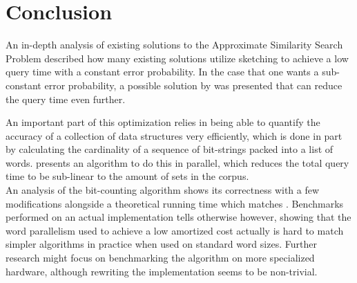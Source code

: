 \section{Conclusion}
An in-depth analysis of existing solutions to the Approximate Similarity Search Problem described how many existing solutions utilize sketching to achieve a low query time with a constant error probability. In the case that one wants a sub-constant error probability, a possible solution by \citet{fast-similarity-search} was presented that can reduce the query time even further.

An important part of this optimization relies in being able to quantify the accuracy of a collection of data structures very efficiently, which is done in part by calculating the cardinality of a sequence of bit-strings packed into a list of words. \citet{fast-similarity-search} presents an algorithm to do this in parallel, which reduces the total query time to be sub-linear to the amount of sets in the corpus.\\
An analysis of the bit-counting algorithm shows its correctness with a few modifications alongside a theoretical running time which matches \cite{fast-similarity-search}. Benchmarks performed on an actual implementation tells otherwise however, showing that the word parallelism used to achieve a low amortized cost actually is hard to match simpler algorithms in practice when used on standard word sizes. Further research might focus on benchmarking the algorithm on more specialized hardware, although rewriting the implementation seems to be non-trivial.
